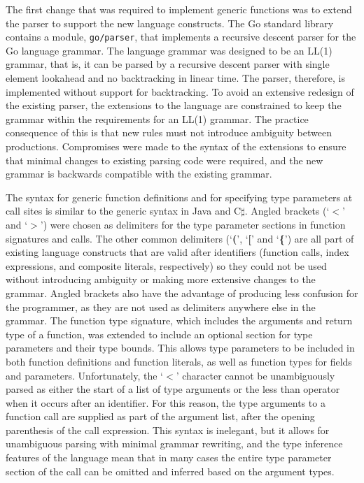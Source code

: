 \documentclass[letterpaper,twocolumn,11pt]{article}
\begin{document}
The first change that was required to implement generic functions was to extend the parser to support the new language constructs. The Go standard library contains a module, \texttt{go/parser}, that implements a recursive descent parser for the Go language grammar. The language grammar was designed to be an LL(1) grammar, that is, it can be parsed by a recursive descent parser with single element lookahead and no backtracking in linear time. The parser, therefore, is implemented without support for backtracking. To avoid an extensive redesign of the existing parser, the extensions to the language are constrained to keep the grammar within the requirements for an LL(1) grammar. The practice consequence of this is that new rules must not introduce ambiguity between productions. Compromises were made to the syntax of the extensions to ensure that minimal changes to existing parsing code were required, and the new grammar is backwards compatible with the existing grammar.

The syntax for generic function definitions and for specifying type parameters at call sites is similar to the generic syntax in Java and C$\sharp$. Angled brackets (`\textbf{$<$}' and `\textbf{$>$}') were chosen as delimiters for the type parameter sections in function signatures and calls. The other common delimiters (`\textbf{(}', `\textbf{[}' and `\textbf{\{}') are all part of existing language constructs that are valid after identifiers (function calls, index expressions, and composite literals, respectively) so they could not be used without introducing ambiguity or making more extensive changes to the grammar. Angled brackets also have the advantage of producing less confusion for the programmer, as they are not used as delimiters anywhere else in the grammar. The function type signature, which includes the arguments and return type of a function, was extended to include an optional section for type parameters and their type bounds. This allows type parameters to be included in both function definitions and function literals, as well as function types for fields and parameters. Unfortunately, the `\textbf{$<$}' character cannot be unambiguously parsed as either the start of a list of type arguments or the less than operator when it occurs after an identifier. For this reason, the type arguments to a function call are supplied as part of the argument list, after the opening parenthesis of the call expression. This syntax is inelegant, but it allows for unambiguous parsing with minimal grammar rewriting, and the type inference features of the language mean that in many cases the entire type parameter section of the call can be omitted and inferred based on the argument types.
\end{document}
